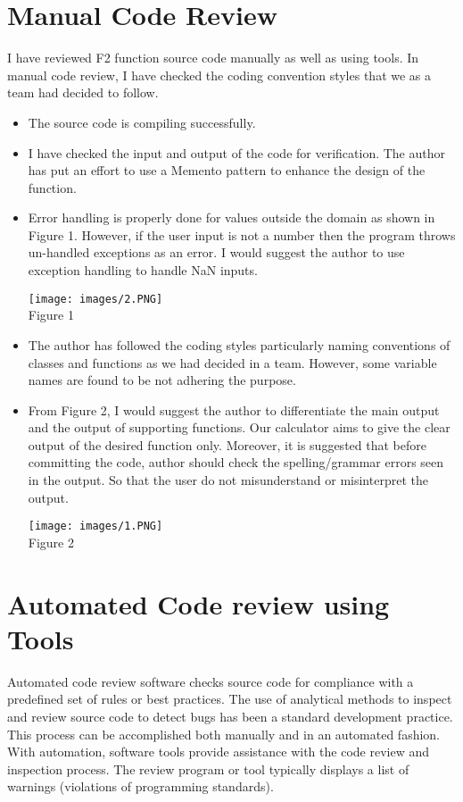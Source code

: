\documentclass[10pt,letterpaper]{article}
\begin{document}
\section{Manual Code Review}
I have reviewed F2 function source code manually as well as using tools. In manual code review, I have checked the coding convention styles that we as a team had decided to follow. 
\begin{itemize}
\item The source code is compiling successfully.
\item I have checked the input and output of the code for verification. The author has put an effort to use a Memento pattern to enhance the design of the function. 
\item Error handling is properly done for values outside the domain as shown in Figure 1. However, if the user input is not a number then the program throws un-handled exceptions as an error. I would suggest the author to use exception handling to handle NaN inputs.
\begin{center}
    \texttt{[image: images/2.PNG]}\\
  \caption{Figure 1}
\end{center} 
\item The author has followed the coding styles particularly naming conventions of classes and functions as we had decided in a team. However, some variable names are found to be not adhering the purpose.
\item From Figure 2, I would suggest the author to differentiate the main output and the output of supporting functions. Our calculator aims to give the clear output of the desired function only. Moreover, it is suggested that before committing the code, author should check the spelling/grammar errors seen in the output. So that the user do not misunderstand or misinterpret the output.
\begin{center}
    \texttt{[image: images/1.PNG]}\\
  \caption{Figure 2}
\end{center} 
\end{itemize}
\section{Automated Code review using Tools}
Automated code review software checks source code for compliance with a predefined set of rules or best practices. The use of analytical methods to inspect and review source code to detect bugs has been a standard development practice. This process can be accomplished both manually and in an automated fashion. With automation, software tools provide assistance with the code review and inspection process. The review program or tool typically displays a list of warnings (violations of programming standards). \cite{Wikipedia}
\end{document}
